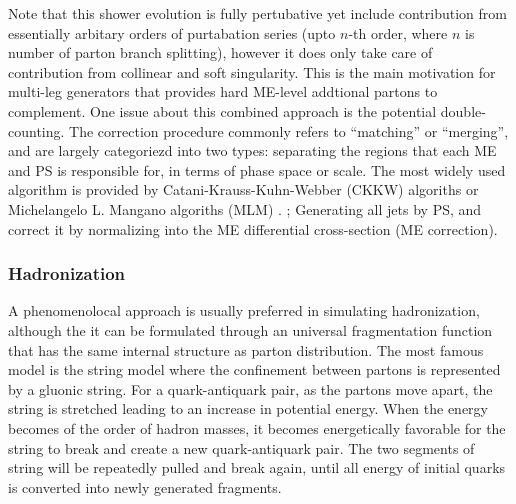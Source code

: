 Note that this shower evolution is fully pertubative yet include contribution from essentially arbitary orders of purtabation series (upto $n$-th order, where $n$ is number of parton branch splitting), however it does only take care of contribution from collinear and soft singularity. This is the main motivation for multi-leg generators that provides hard ME-level addtional partons to complement. One issue about this combined approach is the potential double-counting. The correction procedure commonly refers to ``matching'' or ``merging'', and are largely categoriezd into two types: separating the regions that each ME and PS is responsible for, in terms of phase space or scale. The most widely used algorithm is provided by Catani-Krauss-Kuhn-Webber (CKKW) \cite{CKKW_orig} algoriths or Michelangelo L. Mangano algoriths (MLM) \cite{MLM}. ; Generating all jets by PS, and correct it by normalizing into the ME differential cross-section (ME correction).
\\




\subsubsection{Hadronization}
A phenomenolocal approach is usually preferred in simulating hadronization, although the it can be formulated through an universal fragmentation function that has the same internal structure as parton distribution. 
The most famous model is the string model \cite{LundStringModel} where the confinement between partons is represented by a gluonic string. 
For a quark-antiquark pair, as the partons move apart, the string is stretched leading to an increase in potential energy. 
When the energy becomes of the order of hadron masses, it becomes energetically favorable for the string to break and create a new quark-antiquark pair. 
The two segments of string will be repeatedly pulled and break again, until all energy of initial quarks is converted into newly generated fragments.




